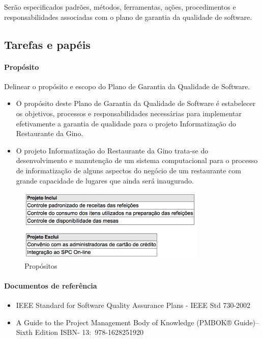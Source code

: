   Serão especificados padrões, métodos, ferramentas, ações, procedimentos e responsabilidades associadas com o plano de garantia da qualidade de software.

\subsection{Tarefas e papéis}

\paragraph{Propósito}
Delinear o propósito e escopo do Plano de Garantia da Qualidade de Software.

\begin{itemize}
\item O propósito deste Plano de Garantia da Qualidade de Software é estabelecer os objetivos, processos e responsabilidades necessárias para implementar efetivamente a garantia de qualidade para o projeto Informatização do Restaurante da Gino.

\item O projeto Informatização do Restaurante da Gino trata-se do desenvolvimento e manutenção de um sistema computacional para o processo de informatização de alguns aspectos do negócio de um restaurante com grande capacidade de lugares que ainda será inaugurado.
\end{itemize}


\begin{figure}[H]
  \centering
  \includegraphics[width=0.8\textwidth]{softwareengineer/images/definition-quality} 
  \caption{Propósitos}
  \label{fig:definition-quality} 
\end{figure}

\paragraph{Documentos de referência}

\begin{itemize}
\item IEEE Standard for Software Quality Assurance Plans - IEEE Std 730-2002
\item A Guide to the Project Management Body of Knowledge (PMBOK® Guide)–Sixth Edition ISBN-
13: 978-1628251920
\end{itemize}


